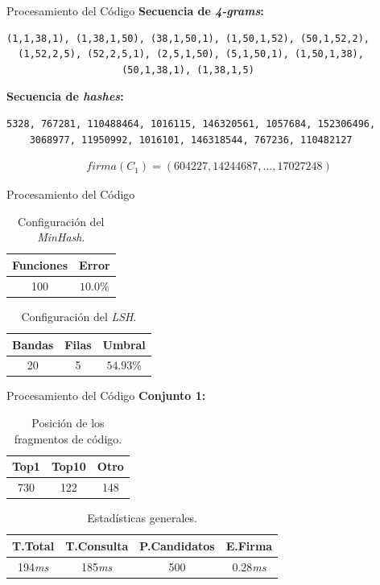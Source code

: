 \documentclass{beamer}
\begin{document}
\begin{frame}[fragile]{Procesamiento del Código}
\textbf{Secuencia de \textit{4-grams}:}
\begin{Verbatim}[fontsize=\scriptsize]
(1,1,38,1), (1,38,1,50), (38,1,50,1), (1,50,1,52), (50,1,52,2),
  (1,52,2,5), (52,2,5,1), (2,5,1,50), (5,1,50,1), (1,50,1,38),
                    (50,1,38,1), (1,38,1,5)
\end{Verbatim}

\textbf{Secuencia de \textit{hashes}:}
\begin{Verbatim}[fontsize=\scriptsize]
5328, 767281, 110488464, 1016115, 146320561, 1057684, 152306496,
    3068977, 11950992, 1016101, 146318544, 767236, 110482127
\end{Verbatim}

\begin{gather*}
firma(C_1) = (604227, 14244687, \dots, 17027248)
\end{gather*}
\end{frame}

\begin{frame}{Procesamiento del Código}
\begin{table}[h]
\caption{Configuración del \textit{MinHash}.}
\centering
\begin{tabular}{cc}
\hline
{Funciones} & {Error} \\
\hline
100 & $10.0\%$ \\ 
\hline
\end{tabular}
\end{table}
\begin{table}[h]
\caption{Configuración del \textit{LSH}.}
\centering
\begin{tabular}{ccc}
\hline
{Bandas} & {Filas} & {Umbral} \\
\hline
20 & 5 & $54.93\%$ \\ 
\hline
\end{tabular}
\end{table}
\end{frame}

\begin{frame}{Procesamiento del Código}
\textbf{Conjunto 1:}
\begin{table}[h]
\caption{Posición de los fragmentos de código.}
\centering
\begin{tabular}{ccc}
\hline
{Top1} & {Top10} & {Otro} \\
\hline
730 & 122 & 148 \\ 
\hline
\end{tabular}
\end{table}
\begin{table}[h]
\caption{Estadísticas generales.}
\centering
\begin{tabular}{cccc}
\hline
{T.Total} & {T.Consulta} & {P.Candidatos} & {E.Firma}\\
\hline
194\textit{ms} & 185\textit{ms} & 500 & $0.28$\textit{ms}\\ 
\hline
\end{tabular}
\end{table}
\end{frame}
\end{document}
